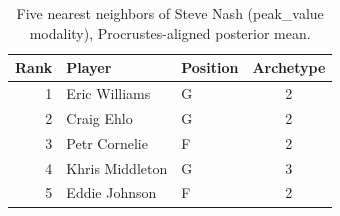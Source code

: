 \begin{table}[htbp]
  \centering\small
  \begin{tabular}{rllc}
    \toprule
    Rank & Player & Position & Archetype \\
    \midrule
    1 & Eric Williams & G & 2 \\
    2 & Craig Ehlo & G & 2 \\
    3 & Petr Cornelie & F & 2 \\
    4 & Khris Middleton & G & 3 \\
    5 & Eddie Johnson & F & 2 \\
    \bottomrule
  \end{tabular}
  \caption{Five nearest neighbors of Steve Nash (peak_value modality), Procrustes-aligned posterior mean.}
  \label{tab:Steve_Nash_neighbors_peak_value}
\end{table}

